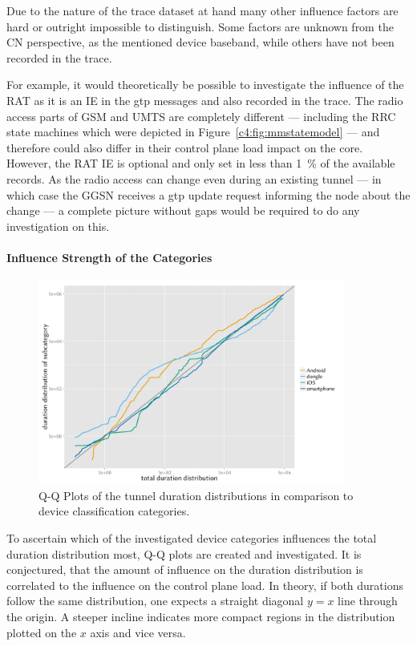 Due to the nature of the trace dataset at hand many other influence factors are hard or outright impossible to distinguish. Some factors are unknown from the \gls{CN} perspective, as the mentioned device baseband, while others have not been recorded in the trace.

For example, it would theoretically be possible to investigate the influence of the \gls{RAT} as it is an \gls{IE} in the \gls{gtp} messages and also recorded in the trace. The radio access parts of \gls{GSM} and \gls{UMTS} are completely different --- including the \gls{RRC} state machines which were depicted in Figure~\ref{c4:fig:mmstatemodel} --- and therefore could also differ in their control plane load impact on the core. However, the \gls{RAT} \gls{IE} is optional and only set in less than \SI{1}{\percent} of the available records. As the radio access can change even during an existing tunnel --- in which case the \gls{GGSN} receives a \gls{gtp} update request informing the node about the change --- a complete picture without gaps would be required to do any investigation on this.


\paragraph{Influence Strength of the Categories}

\begin{figure}[htb]
	\centering
	\includegraphics[width=0.9\textwidth]{images/R-duration-qq-category-comparison.pdf}
	\caption{Q-Q Plots of the tunnel duration distributions in comparison to device classification categories.}
\label{c4:fig:qq-plots}
\end{figure}


To ascertain which of the investigated device categories influences the total duration distribution most, Q-Q plots are created and investigated. It is conjectured, that the amount of influence on the duration distribution is correlated to the influence on the control plane load. In theory, if both durations follow the same distribution, one expects a straight diagonal $y=x$ line through the origin. A steeper incline indicates more compact regions in the distribution plotted on the $x$ axis and vice versa.

